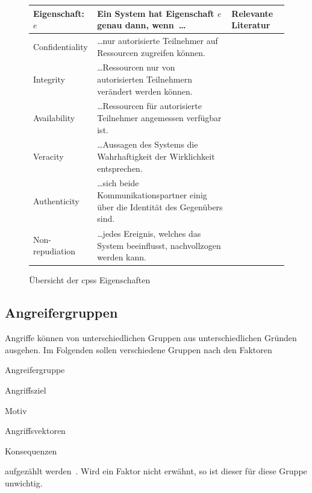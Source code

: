 \documentclass[final,bibliography=totocnumbered]{include/sikseminar}
\newcommand{\cps}{\glspl{cps}\xspace}
\begin{document}
    \begin{figure}[h]
        \centering
        \begin{longtabu}
            to \linewidth { | l | X[6,l] | X[1.1,l] | }
            \hline
            Eigenschaft: $e$&Ein System hat Eigenschaft $e$ genau dann, wenn~\ldots&Relevante Literatur \\
            \hline
            Confidentiality&
            \ldots nur autorisierte Teilnehmer auf Ressourcen zugreifen können.&
            \cite{CH13} \\
            \hline
            Integrity&
            \ldots Ressourcen nur von autorisierten Teilnehmern verändert werden können.&
            \cite{CH13} \\
            \hline
            Availability&
            \ldots Ressourcen für autorisierte Teilnehmer angemessen verfügbar ist.&
            \cite{CH13} \\
            \hline
            Veracity &
            \ldots Aussagen des Systems die Wahrhaftigkeit der Wirklichkeit entsprechen.&
            \cite{KLG15} \cite{GK16}\\
            \hline
            Authenticity&
            \ldots sich beide Kommunikationspartner einig über die Identität des Gegenübers sind.&
            \cite{SFJ17} \cite{CH13}\\
            \hline
            Non-repudiation &
            \ldots jedes Ereignis, welches das System beeinflusst, nachvollzogen werden kann.&
            \cite{CH13} \cite{SFJ17} \cite{Ross15} \\
            \hline
        \end{longtabu}
        \caption{Übersicht der \cps Eigenschaften}
        \label{fig:table}
    \end{figure}



    \subsection{Angreifergruppen}
    \label{subsec:angreifergruppen}

    Angriffe können von unterschiedlichen Gruppen aus unterschiedlichen Gründen ausgehen.
    Im Folgenden sollen verschiedene Gruppen nach den Faktoren
    \begin{enumerate*}[label=(\alph*),before=\unskip{: }, itemjoin={{; }}, itemjoin*={{, und }}]
        \item Angreifergruppe\label{factor:angreifergruppe}
        \item Angriffsziel\label{factor:target}
        \item Motiv\label{factor:motiv}
        \item Angriffsvektoren\label{factor:methode}
        \item Konsequenzen\label{factor:konsequenz}
    \end{enumerate*} aufgezählt werden~\cite{HLL+17}.
    Wird ein Faktor nicht erwähnt, so ist dieser für diese Gruppe unwichtig.
\end{document}
